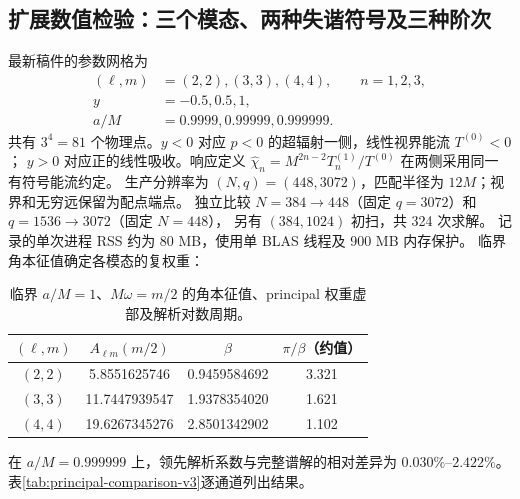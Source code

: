 \documentclass[UTF8,fontset=fandol,11pt,a4paper]{ctexart}
\numberwithin{equation}{section}
\begin{document}
\subsection{扩展数值检验：三个模态、两种失谐符号及三种阶次}
最新稿件的参数网格为
\begin{equation}
\begin{split}
(\ell,m)&=(2,2),(3,3),(4,4),\qquad n=1,2,3,\\
y&=-0.5,0.5,1,\\
a/M&=0.9999,0.99999,0.999999.
\end{split}
\end{equation}
共有 $3^4=81$ 个物理点。$y<0$ 对应 $p<0$ 的超辐射一侧，线性视界能流 $T^{(0)}<0$；
$y>0$ 对应正的线性吸收。响应定义 $\widehat\chi_n=M^{2n-2}T_n^{(1)}/T^{(0)}$ 在两侧采用同一有符号能流约定。
生产分辨率为 $(N,q)=(448,3072)$，匹配半径为 $12M$；视界和无穷远保留为配点端点。
独立比较 $N=384\to448$（固定 $q=3072$）和 $q=1536\to3072$（固定 $N=448$），
另有 $(384,1024)$ 初扫，共 324 次求解。
记录的单次进程 RSS 约为 80 MB，使用单 BLAS 线程及 900 MB 内存保护。
临界角本征值确定各模态的复权重：
\begin{table}[htbp]\centering\small
\caption{临界 $a/M=1$、$M\omega=m/2$ 的角本征值、principal 权重虚部及解析对数周期。}
\label{tab:principal-weights-v3}
\begin{tabular}{cccc}\toprule
$(\ell,m)$ & $A_{\ell m}(m/2)$ & $\beta$ & $\pi/\beta$（约值）\\\midrule
$(2,2)$ & 5.8551625746 & 0.9459584692 & 3.321\\
$(3,3)$ & 11.7447939547 & 1.9378354020 & 1.621\\
$(4,4)$ & 19.6267345276 & 2.8501342902 & 1.102\\\bottomrule
\end{tabular}\end{table}
在 $a/M=0.999999$ 上，领先解析系数与完整谱解的相对差异为 $0.030\%$--$2.422\%$。
表\ref{tab:principal-comparison-v3}逐通道列出结果。
\end{document}
